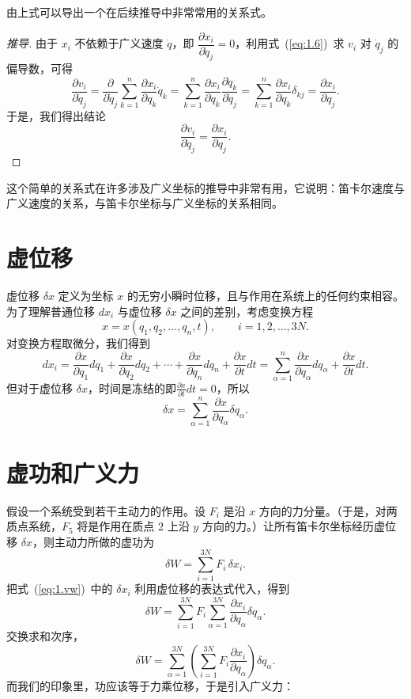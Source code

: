 由上式可以导出一个在后续推导中非常常用的关系式。
\begin{proof}[推导]
由于 $x_i$ 不依赖于广义速度 $\dot{q}$，即 $\dfrac{\partial x_i}{\partial \dot{q}_j} = 0$，利用式~(\ref{eq:1.6})~求 $v_i$ 对 $\dot{q}_j$ 的偏导数，可得
\begin{equation}\label{eq:1.7}
\frac{\partial v_i}{\partial \dot{q}_j} = \frac{\partial}{\partial \dot{q}_j}\sum_{k=1}^{n}\frac{\partial x_i}{\partial q_k}\dot{q}_k = \sum_{k=1}^{n}\frac{\partial x_i}{\partial q_k}\frac{\partial \dot{q}_k}{\partial \dot{q}_j} = \sum_{k=1}^{n}\frac{\partial x_i}{\partial q_k}\delta_{kj} = \frac{\partial x_i}{\partial q_j}.
\end{equation}
于是，我们得出结论
\begin{equation}\label{eq:1.8}
\frac{\partial v_i}{\partial \dot{q}_j} = \frac{\partial x_i}{\partial q_j}.
\end{equation}
\end{proof}
这个简单的关系式在许多涉及广义坐标的推导中非常有用，它说明：笛卡尔速度与广义速度的关系，与笛卡尔坐标与广义坐标的关系相同。

\section{虚位移}
虚位移 $\delta x$ 定义为坐标 $x$ 的无穷小瞬时位移，且与作用在系统上的任何约束相容。
为了理解普通位移 $dx_i$ 与虚位移 $\delta x$ 之间的差别，考虑变换方程$$x = x(q_1, q_2, \ldots, q_n, t), \qquad i = 1, 2, \ldots, 3N.$$
对变换方程取微分，我们得到$$dx_i = \frac{\partial x}{\partial q_1}dq_1 + \frac{\partial x}{\partial q_2}dq_2 + \cdots + \frac{\partial x}{\partial q_n}dq_n + \frac{\partial x}{\partial t}dt = \sum_{\alpha=1}^{n}\frac{\partial x}{\partial q_\alpha}dq_\alpha + \frac{\partial x}{\partial t}dt.$$
但对于虚位移 $\delta x$，时间是冻结的即$\frac{\partial x}{\partial t}dt=0$，所以$$\delta x = \sum_{\alpha=1}^{n}\frac{\partial x}{\partial q_\alpha}\delta q_\alpha. $$

\section{虚功和广义力}

假设一个系统受到若干主动力的作用。设 $F_i$ 是沿 $x$ 方向的力分量。（于是，对两质点系统，$F_5$ 将是作用在质点 2 上沿 $y$ 方向的力。）让所有笛卡尔坐标经历虚位移 $\delta x$，则主动力所做的虚功为
\begin{equation}\label{eq:1.vw}
\delta W = \sum_{i=1}^{3N}F_i\,\delta x_i.
\end{equation}
把式~(\ref{eq:1.vw})~中的 $\delta x_i$ 利用虚位移的表达式代入，得到
\begin{equation*}
\delta W = \sum_{i=1}^{3N}F_i\sum_{\alpha=1}^{3N}\frac{\partial x_i}{\partial q_\alpha}\delta q_\alpha.
\end{equation*}
交换求和次序，
\begin{equation*}
\delta W = \sum_{\alpha=1}^{3N}\left(\sum_{i=1}^{3N}F_i\frac{\partial x_i}{\partial q_\alpha}\right)\delta q_\alpha.
\end{equation*}
而我们的印象里，功应该等于力乘位移，于是引入广义力：

